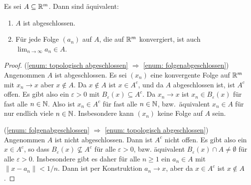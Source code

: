 \documentclass[a4paper,10pt]{article}
\begin{document}
\begin{lem}\label{lem: Folgenabgeschlossenheit}
 Es sei $A \subseteq \mathbb{R}^m$. Dann sind äquivalent:
 \begin{enumerate}
  \item\label{enum: topologisch abgeschlossen}
   $A$ ist abgeschlossen.
  \item\label{enum: folgenabgeschlossen}
   Für jede Folge $(a_n)$ auf $A$, die auf $\mathbb{R}^m$ konvergiert, ist auch $\lim_{n \to \infty} a_n \in A$.
 \end{enumerate}
\end{lem}
\begin{proof}
 (\ref{enum: topologisch abgeschlossen} $\Rightarrow$ \ref{enum: folgenabgeschlossen}) Angenommen $A$ ist abgeschlossen. Es sei $(x_n)$ eine konvergente Folge auf $\mathbb{R}^m$ mit $x_n \to x$ aber $x \notin A$. Da $x \notin A$ ist $x \in A^c$, und da $A$ abgeschlossen ist, ist $A^c$ offen. Es gibt also ein $\varepsilon > 0$ mit $B_\varepsilon(x) \subseteq A^c$. Da $x_n \to x$ ist $x_n \in B_\varepsilon(x)$ für fast alle $n \in \mathbb{N}$. Also ist $x_n \in A^c$ für fast alle $n \in \mathbb{N}$, bzw.\ äquivalent $x_n \in A$ für nur endlich viele $n \in \mathbb{N}$. Insbesondere kann $(x_n)$ keine Folge auf $A$ sein.
 
 (\ref{enum: folgenabgeschlossen} $\Rightarrow$ \ref{enum: topologisch abgeschlossen}) Angenommen $A$ ist nicht abgeschlossen. Dann ist $A^c$ nicht offen. Es gibt also ein $x \in A^c$, so dass $B_\varepsilon(x) \nsubseteq A^c$ für alle $\varepsilon > 0$, bzw. äquivalent $B_\varepsilon(x) \cap A \neq \emptyset$ für alle $\varepsilon > 0$. Insbesondere gibt es daher für alle $n \geq 1$ ein $a_n \in A$ mit $\|x-a_n\| < 1/n$. Dann ist per Konstruktion $a_n \to x$, aber da $x \in A^c$ ist $x \notin A$.
\end{proof}
\end{document}
